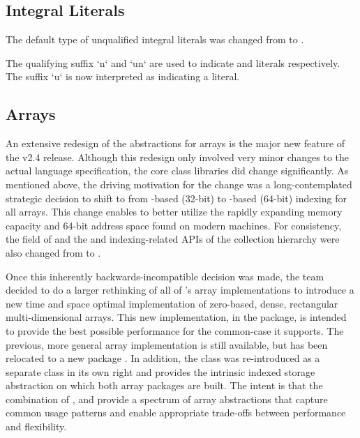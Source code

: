 \subsection{Integral Literals}

The default type of unqualified integral literals was changed from
 to . 

The qualifying suffix \xcd`n` and \xcd`un` are used to indicate
 and  literals respectively.  The suffix \xcd`u` is
now interpreted as indicating a  literal.

\subsection{Arrays}

An extensive redesign of the \Xten{} abstractions for arrays is the
major new feature of the \Xten{} v2.4 release.  Although this redesign
only involved very minor changes to the actual \Xten{} language
specification, the core class libraries did change significantly.  As
mentioned above, the driving motivation for
the change was a long-contemplated strategic decision to shift to from
-based (32-bit) to -based (64-bit) indexing for all
\Xten{} arrays. This change enables \Xten{} to better utilize the rapidly
expanding memory capacity and 64-bit address space found on modern
machines. For consistency, the  field of  and
the  and indexing-related APIs of the 
collection hierarchy were also changed from  to .

Once this inherently backwards-incompatible decision was made, the
\Xten{} team decided to do a larger rethinking of all of \Xten{}'s
array implementations to introduce a new time and space optimal
implementation of zero-based, dense, rectangular multi-dimensional
arrays.  This new implementation, in the  package, is
intended to provide the best possible performance for the common-case
it supports.  The previous, more general array implementation is still
available, but has been relocated to a new package
.  In addition, the 
class was re-introduced as a separate class in its own right and
provides the intrinsic indexed storage abstraction on which both array
packages are built.  The intent is that the combination of ,
 and  provide a spectrum of array
abstractions that capture common usage patterns and enable appropriate
trade-offs between performance and flexibility. 


